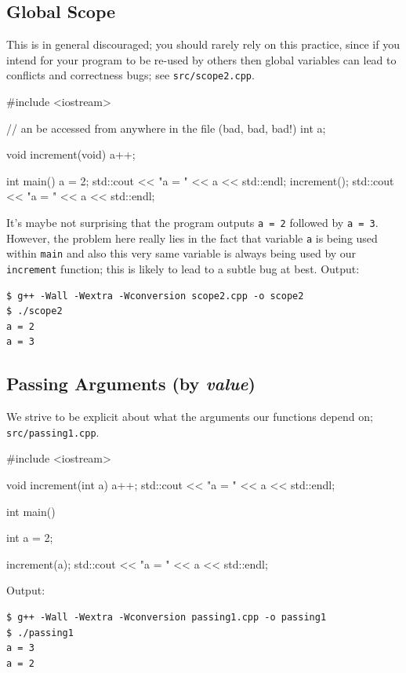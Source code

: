 \documentclass[12pt,letterpaper,twoside]{article}
\begin{document}
\subsection{Global Scope} This is in general discouraged; you should rarely rely on this 
practice, since if you intend for your program to be re-used by others then global variables can lead to conflicts and correctness bugs; see
\texttt{src/scope2.cpp}.

\begin{cpp}
#include <iostream>

// an be accessed from anywhere in the file (bad, bad, bad!)
int a;

void increment(void) { a++; }

int main() {
  a = 2;
  std::cout << "a = " << a << std::endl;
  increment();
  std::cout << "a = " << a << std::endl;
}
\end{cpp}

It's maybe not surprising that the program outputs \texttt{a = 2} followed by \texttt{a = 3}. However, the problem here really lies in the fact that variable \texttt{a} is being used within \texttt{main} and also this very same variable is always being used by our \texttt{increment} function; this is likely to lead to a subtle bug at best. Output:
{\small
\begin{verbatim}
$ g++ -Wall -Wextra -Wconversion scope2.cpp -o scope2
$ ./scope2
a = 2
a = 3
\end{verbatim}
}

\subsection{Passing Arguments (by \emph{value})}
 We strive to be explicit about what the arguments our
functions depend on; 
\texttt{src/passing1.cpp}.

\begin{cpp}
#include <iostream>

void increment(int a) {
  a++;
  std::cout << "a = " << a << std::endl;
}

int main() {
  int a = 2;

  increment(a);
  std::cout << "a = " << a << std::endl;
}
\end{cpp}

Output:

{\small
\begin{verbatim}
$ g++ -Wall -Wextra -Wconversion passing1.cpp -o passing1
$ ./passing1
a = 3
a = 2
\end{verbatim}
}
\end{document}
